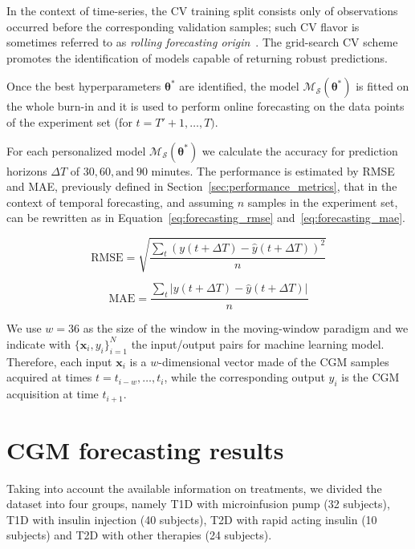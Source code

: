 In the context of time-series, the CV training split consists only of observations occurred before the corresponding validation samples; such CV flavor is sometimes referred to as {\em rolling forecasting origin}~\cite{tashman2000out}. The grid-search CV scheme promotes the identification of models capable of returning robust predictions. %

Once the best hyperparameters $\bm{\theta}^*$ are identified, the model $\mathcal{M}_\mathcal{S}(\bm{\theta}^*)$ is fitted on the whole burn-in and it is used to perform online forecasting on the data points of the experiment set (\ie for $t = T'+1, \dots, T)$.

For each personalized model $\mathcal{M}_\mathcal{S}(\bm{\theta}^*)$ we calculate the accuracy for prediction horizons $\Delta T$ of $30, 60, \text{and}~90$ minutes. The performance is estimated by  RMSE and MAE, previously defined in Section~\ref{sec:performance_metrics}, that in the context of temporal forecasting, and assuming $n$ samples in the experiment set, can be rewritten as in Equation~\eqref{eq:forecasting_rmse} and~\eqref{eq:forecasting_mae}.

\begin{equation} \label{eq:forecasting_rmse}
\text{RMSE} = \sqrt{\frac{\sum_t(y(t+\Delta T) - \hat{y}(t+\Delta T))^2}{n}}
\end{equation}

\begin{equation} \label{eq:forecasting_mae}
\text{MAE} = \frac{\sum_t|y(t+\Delta T) - \hat{y}(t+\Delta T)|}{n}
\end{equation}

We use $w=36$ as the size of the window in the moving-window paradigm and we  indicate with $\{\bm{x}_i, y_i\}_{i=1}^N$  the input/output pairs for machine learning model. 
Therefore, each input $\bm{x}_i$ is a $w$-dimensional vector made of the CGM samples acquired at times $t=t_{i-w},\dots,t_i$, while the corresponding output $y_i$ is the CGM acquisition at time $t_{i+1}$.


\section{CGM forecasting results}
Taking into account the available information on treatments, we divided the dataset into four groups, namely T1D with microinfusion pump (32 subjects), T1D with insulin injection (40 subjects), T2D with rapid acting insulin (10 subjects) and T2D with other therapies (24 subjects).


